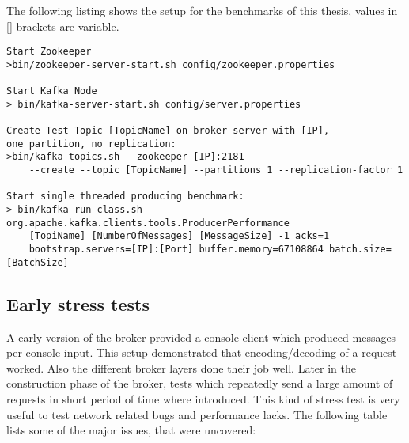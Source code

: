 The following listing shows the setup for the benchmarks of this thesis,
values in [] brackets are variable. 
\begin{verbatim}
Start Zookeeper
>bin/zookeeper-server-start.sh config/zookeeper.properties

Start Kafka Node 
> bin/kafka-server-start.sh config/server.properties

Create Test Topic [TopicName] on broker server with [IP], 
one partition, no replication: 
>bin/kafka-topics.sh --zookeeper [IP]:2181 
    --create --topic [TopicName] --partitions 1 --replication-factor 1

Start single threaded producing benchmark: 
> bin/kafka-run-class.sh org.apache.kafka.clients.tools.ProducerPerformance 
    [TopiName] [NumberOfMessages] [MessageSize] -1 acks=1 
    bootstrap.servers=[IP]:[Port] buffer.memory=67108864 batch.size=[BatchSize]
\end{verbatim}




\newpage
\subsection{Early stress tests}
A early version of the broker provided a console client which produced 
messages per console input. This setup demonstrated that encoding/decoding of a
request worked. Also the different broker layers done their job well.
Later in the construction phase of the broker, tests which repeatedly send
a large amount of requests in short period of time where introduced. This kind
of stress test is very useful to test network related bugs and performance
lacks. The following table lists some of the major issues, that were uncovered: 

